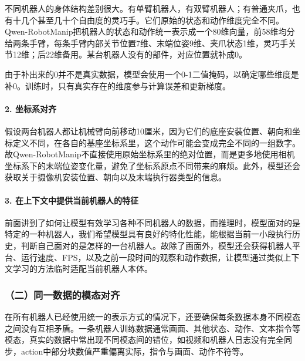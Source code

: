 不同机器人的身体结构差别很大。有单臂机器人，有双臂机器人；有普通夹爪，也有十几个甚至几十个自由度的灵巧手。它们原始的状态和动作维度完全不同。Qwen-RobotManip把机器人的状态和动作统一表示成一个80维向量，前58维均分给两条手臂，每条手臂内部关节位置7维、末端位姿9维、夹爪状态1维，灵巧手关节12维；后22维备用。某台机器人没有的部件，对应位置就补成0。

由于补出来的0并不是真实数据，模型会使用一个0-1二值掩码，以确定哪些维度是补0。训练时，只有真实存在的维度参与计算误差和更新梯度。

\hypertarget{ux5750ux6807ux7cfbux5bf9ux9f50}{%
\paragraph{2. 坐标系对齐}\label{ux5750ux6807ux7cfbux5bf9ux9f50}}

假设两台机器人都让机械臂向前移动10厘米，因为它们的底座安装位置、朝向和坐标定义不同，在各自的基座坐标系里，这个动作可能会变成完全不同的一组数字。故Qwen-RobotManip不直接使用原始坐标系里的绝对位置，而是更多地使用相机坐标系下的末端位姿变化量，避免了坐标系原点不同带来的麻烦。此外，模型还会获取关于摄像机安装位置、朝向以及末端执行器类型的信息。

\hypertarget{ux5728ux4e0aux4e0bux6587ux4e2dux63d0ux4f9bux5f53ux524dux673aux5668ux4ebaux7684ux7279ux5f81}{%
\paragraph{3. 在上下文中提供当前机器人的特征}\label{ux5728ux4e0aux4e0bux6587ux4e2dux63d0ux4f9bux5f53ux524dux673aux5668ux4ebaux7684ux7279ux5f81}}

前面讲到了如何让模型有效学习各种不同机器人的数据，而推理时，模型面对的是特定的一种机器人，我们希望模型具有良好的特化性能，能根据当前一小段执行历史，判断自己面对的是怎样的一台机器人。故除了画面外，模型还会获得机器人平台、运行速度、FPS，以及之前一段时间的观察和动作数据，让模型通过类似上下文学习的方法临时适配当前机器人本体。

\hypertarget{ux4e8cux540cux4e00ux6570ux636eux7684ux6a21ux6001ux5bf9ux9f50}{%
\subsubsection{（二）同一数据的模态对齐}\label{ux4e8cux540cux4e00ux6570ux636eux7684ux6a21ux6001ux5bf9ux9f50}}

在所有机器人已经使用统一的表示方式的情况下，还要确保每条数据本身不同模态之间没有互相矛盾。一条机器人训练数据通常画面、其他状态、动作、文本指令等模态，真实的数据中常出现不同模态间的错位，如视频和机器人日志没有完全同步，action中部分块数值严重偏离实际，指令与画面、动作不符等。

